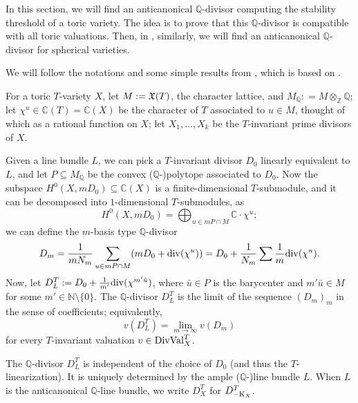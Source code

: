 \newcommand{\TDValo}{\DVal^{T, \circ}}

In this section, we will find an anticanonical $\mathbb{Q}$-divisor computing the stability threshold of a toric variety. The idea is to prove that this $\mathbb{Q}$-divisor is compatible with all toric valuations. Then, in , similarly, we will find an anticanonical $\mathbb{Q}$-divisor for spherical varieties.

We will follow the notations and some simple results from \cite[\S7]{BJ_thre_val_kst}, which is based on \cite{Fulton_intro_tor_vari}.

For a toric $T$-variety $X$, let $M := \mathfrak{X}(T)$, the character lattice, and $M_\mathbb{Q}: = M \otimes_\mathbb{Z} \mathbb{Q}$; let $\chi^u \in \mathbb{C}(T) = \mathbb{C}(X)$ be the character of $T$ associated to $u \in M$, thought of which as a rational function on $X$; let $X_1, \dots, X_k$ be the $T$-invariant prime divisors of $X$.

Given a line bundle $L$, we can pick a $T$-invariant divisor $D_0$ linearly equivalent to $L$, and let $P \subseteq M_\mathbb{Q}$ be the convex ($\mathbb{Q}$-)polytope associated to $D_0$.
% 
Now the subspace $H^0(X, m D_0) \subseteq \mathbb{C}(X)$ is a finite-dimensional $T$-submodule, and it can be decomposed into $1$-dimensional $T$-submodules, as
\begin{equation}
	H^0(X, m D_0) = \bigoplus_{u \in m P \cap M} \mathbb{C} \cdot \chi^u;
\end{equation}
we can define the $m$-basis type $\mathbb{Q}$-divisor
\begin{equation*}
	D_m = {1 \over m N_m} \sum_{u \in m P \cap M}( m D_0 + \div(\chi^u) ) = D_0 + {1 \over N_m} \sum {1 \over m} \div(\chi^u).
\end{equation*}
Now, let $D^T_L := D_0 + {1 \over m'} \div(\chi^{m' \bar{u}})$, where $\bar{u} \in P$ is the barycenter and $m' \bar{u} \in M$ for some $m' \in \mathbb{N} \setminus \{0\}$. The $\mathbb{Q}$-divisor $D^T_L$ is the limit of the sequence $(D_m)_m$ in the sense of coefficients; equivalently,
\begin{equation}\label{eq:toric:vDTL}
	v(D^T_L) = \lim_{m \to \infty} v(D_m)
\end{equation}
for every $T$-invariant valuation $v \in \mathrm{DivVal}^T_X$.

The $\mathbb{Q}$-divisor $D^T_L$ is independent of the choice of $D_0$ (and thus the $T$-linearization). It is uniquely determined by the ample ($\mathbb{Q}$-)line bundle $L$. When $L$ is the anticanonical $\mathbb{Q}$-line bundle, we write $D^T_X$ for $D^T_{-\mathrm{K}_X}$.

